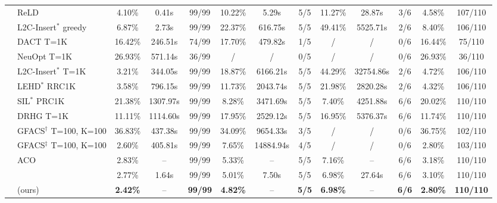 \begin{table}[htbp]
\begin{threeparttable}
\begin{tabular}{c|l|ccc|ccc|ccc|cc}
          & ReLD  & 4.10\% & 0.41s & 99/99 & 10.22\% & 5.29s & 5/5   & 11.27\% & 28.87s & 3/6   &  {{4.58\%}} & 107/110 \\
          & L2C-Insert$^*$ greedy & 6.87\% & 2.73s & 99/99 & 22.37\% & 616.75s & 5/5   & 49.41\% & 5525.71s & 2/6   & 8.40\% & 106/110 \\
\cmidrule{2-13}          & DACT T=1K & 16.42\% & 246.51s & 74/99 & 17.70\% & 479.82s & 1/5   & /     & /     & 0/6   & 16.44\% & 75/110 \\
          & NeuOpt T=1K & 26.93\% & 571.14s & 36/99 & /     & /     & 0/5   & /     & /     & 0/6   & 26.93\% & 36/110 \\
\cmidrule{2-13}          & L2C-Insert$^*$ T=1K & 3.21\% & 344.05s & 99/99 & 18.87\% & 6166.21s & 5/5   & 44.29\% & 32754.86s & 2/6   & 4.72\% & 106/110 \\
          & LEHD$^*$ RRC1K & 3.58\% & 796.15s & 99/99 & 11.73\% & 2043.74s & 5/5   & 21.98\% & 2820.28s & 2/6   & 4.32\% & 106/110 \\
          & SIL$^*$ PRC1K  & 21.38\% & 1307.97s & 99/99 & 8.28\% & 3471.69s & 5/5   & 7.40\% & 4251.88s & 6/6   & 20.02\% &  {{110}/110}   \\
          & DRHG T=1K & 11.11\% & 1114.60s & 99/99 & 17.95\% & 2529.12s & 5/5   & 16.95\% & 5376.37s & 6/6   & 11.74\% &  {{110}/110}   \\
\cmidrule{2-13}          & GFACS$^{\dagger}$ T=100, K=100 & 36.83\% & 437.38s & 99/99 & 34.09\% & 9654.33s & 3/5   & /     & /     & 0/6   & 36.75\% & 102/110 \\
          & GFACS$^{\ddagger}$ T=100, K=100 & 2.60\% & 405.81s & 99/99 & 7.65\% & 14884.94s & 4/5   & /     & /     & 0/6   & 2.80\% & 103/110 \\
    \midrule

\cmidrule{2-13}
          & ACO
          & 2.83\% & -- & 99/99
          & 5.33\% & -- & 5/5
          & 7.16\% & -- & 6/6
          & 3.18\% & 110/110 \\

          & \DyNACO{}
          & 2.77\% & 1.64s & 99/99
          & 5.01\% & 7.50s & 5/5
          & 6.98\% & 27.64s & 6/6
          & 3.10\% & 110/110 \\

          & \DyNACS{} (ours)
          & \textbf{2.42\%} & -- & \textbf{99/99}
          & \textbf{4.82\%} & -- & \textbf{5/5}
          & \textbf{6.98\%} & -- & \textbf{6/6}
          & \textbf{2.80\%} & \textbf{110/110} \\




\end{tabular}
\end{threeparttable}
\end{table}
